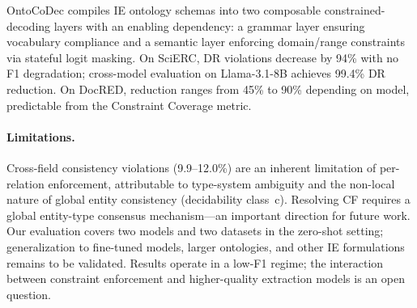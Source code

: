 \documentclass[11pt,a4paper]{article}
\newcommand{\sys}{OntoCoDec\xspace}
\begin{document}
\sys compiles IE ontology schemas into two composable constrained-decoding layers with an enabling dependency: a grammar layer ensuring vocabulary compliance and a semantic layer enforcing domain/range constraints via stateful logit masking.
On SciERC, DR violations decrease by 94\% with no F1 degradation; cross-model evaluation on Llama-3.1-8B achieves 99.4\% DR reduction.
On DocRED, reduction ranges from 45\% to 90\% depending on model, predictable from the Constraint Coverage metric.

\paragraph{Limitations.}
Cross-field consistency violations (9.9--12.0\%) are an inherent limitation of per-relation enforcement, attributable to type-system ambiguity and the non-local nature of global entity consistency (decidability class~c).
Resolving CF requires a global entity-type consensus mechanism---an important direction for future work.
Our evaluation covers two models and two datasets in the zero-shot setting; generalization to fine-tuned models, larger ontologies, and other IE formulations remains to be validated.
Results operate in a low-F1 regime; the interaction between constraint enforcement and higher-quality extraction models is an open question.
\end{document}
